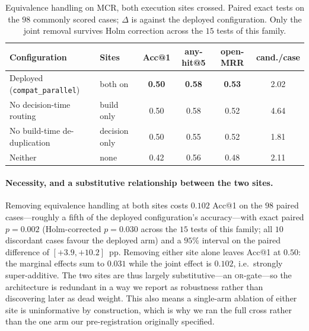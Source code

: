 \begin{table}[t]
\centering
\small
\caption{Equivalence handling on MCR, both execution sites crossed. Paired exact tests on the $98$ commonly scored cases; $\Delta$ is against the deployed configuration. Only the joint removal survives Holm correction across the $15$ tests of this family.}
\label{tab:eq-site}
\begin{tabular}{llcccc}
\toprule
Configuration & Sites & Acc@1 & any-hit@5 & open-MRR & cand./case \\
\midrule
Deployed (\texttt{compat\_parallel}) & both on & \textbf{0.50} & \textbf{0.58} & \textbf{0.53} & 2.02 \\
No decision-time routing & build only & 0.50 & 0.58 & 0.52 & 4.64 \\
No build-time de-duplication & decision only & 0.50 & 0.55 & 0.52 & 1.81 \\
Neither & none & 0.42 & 0.56 & 0.48 & 2.11 \\
\bottomrule
\end{tabular}
\end{table}

\paragraph{Necessity, and a substitutive relationship between the two sites.}
Removing equivalence handling at both sites costs $0.102$ Acc@1 on the $98$ paired cases---roughly a fifth of the deployed configuration's accuracy---with exact paired $p=0.002$ (Holm-corrected $p=0.030$ across the $15$ tests of this family; all $10$ discordant cases favour the deployed arm) and a $95\%$ interval on the paired difference of $[+3.9, +10.2]$~pp.
Removing either site alone leaves Acc@1 at $0.50$: the marginal effects sum to $0.031$ while the joint effect is $0.102$, i.e.\ strongly super-additive.
The two sites are thus largely substitutive---an \textsc{or}-gate---so the architecture is redundant in a way we report as robustness rather than discovering later as dead weight.
This also means a single-arm ablation of either site is uninformative by construction, which is why we ran the full cross rather than the one arm our pre-registration originally specified.

